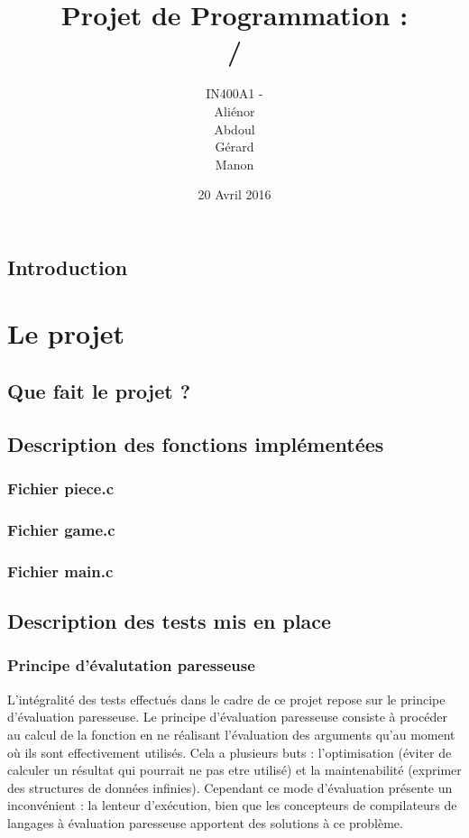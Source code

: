 \documentclass{report}
\title{Projet de Programmation :\\ \bsc{rush hour} / \bsc{âne rouge}}
\author{IN400A1 - \bsc{Groupe 6}\\Aliénor \bsc{brabant}\\Abdoul \bsc{diallo}\\Gérard \bsc{lézé}\\{Manon \bsc{philippot}}}
\date{20 Avril 2016}
\begin{document}
\maketitle
\tableofcontents

\chapter*{Introduction}

\part{Le projet}

\chapter{Que fait le projet ?}

\chapter{Description des fonctions implémentées}
\section{Fichier piece.c}
\section{Fichier game.c}
\section{Fichier main.c}

\chapter{Description des tests mis en place}

\section{Principe d'évalutation paresseuse}
\label{Lexa}
L'intégralité des tests effectués dans le cadre de ce projet repose sur le principe d'évaluation paresseuse. Le principe d'évaluation paresseuse consiste à procéder au calcul de la fonction en ne réalisant l'évaluation des arguments qu'au moment où ils sont effectivement utilisés. Cela a plusieurs buts : l'optimisation (éviter de calculer un résultat qui pourrait ne pas etre utilisé) et la maintenabilité (exprimer des structures de données infinies). Cependant ce mode d'évaluation présente un inconvénient : la lenteur d'exécution, bien que les concepteurs de compilateurs de langages à évaluation paresseuse apportent des solutions à ce problème.
\end{document}
